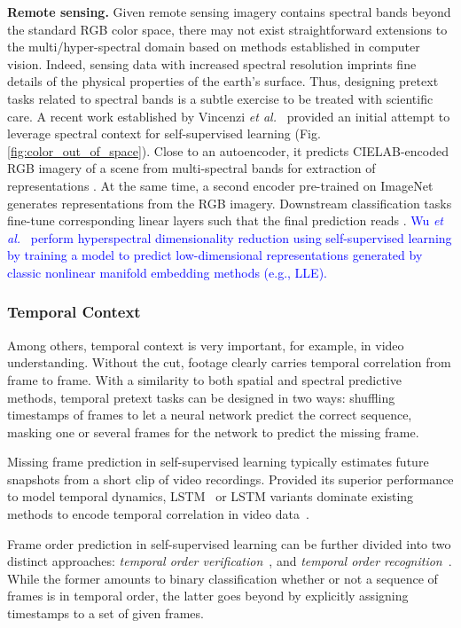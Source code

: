 \documentclass[lettersize,journal]{IEEEtran}
\newcommand{\etal}{\textit{et al.}}
\begin{document}
\textbf{Remote sensing.} Given remote sensing imagery contains spectral bands beyond the standard RGB color space, there may not exist straightforward extensions to the multi/hyper-spectral domain based on methods established in computer vision. Indeed, sensing data with increased spectral resolution imprints fine details of the physical properties of the earth's surface. Thus, designing pretext tasks related to spectral bands is a subtle exercise to be treated with scientific care. A recent work established by Vincenzi \etal~\cite{vincenzi2021color} provided an initial attempt to leverage spectral context for self-supervised learning (Fig. \ref{fig:color_out_of_space}). Close to an autoencoder, it predicts CIELAB-encoded RGB imagery of a scene from multi-spectral bands for extraction of representations . At the same time, a second encoder pre-trained on ImageNet generates representations  from the RGB imagery. Downstream classification tasks fine-tune corresponding linear layers  such that the final prediction reads . \textcolor{blue}{Wu \etal~\cite{wu2021hyper} perform hyperspectral dimensionality reduction using self-supervised learning by training a model to predict low-dimensional representations generated by classic nonlinear manifold embedding methods (e.g., LLE).}


\subsubsection{Temporal Context}

Among others, temporal context is very important, for example, in video understanding. Without the cut, footage clearly carries temporal correlation from frame to frame. With a similarity to both spatial and spectral predictive methods, temporal pretext tasks can be designed in two ways:  shuffling timestamps of frames to let a neural network predict the correct sequence,  masking one or several frames for the network to predict the missing frame.

Missing frame prediction in self-supervised learning typically estimates future snapshots from a short clip of video recordings. Provided its superior performance to model temporal dynamics, LSTM~\cite{6772729} or LSTM variants dominate existing methods to encode temporal correlation in video data~\cite{srivastava2015unsupervised,villegas2017decomposing,finn2016unsupervised}.

Frame order prediction in self-supervised learning can be further divided into two distinct approaches:  \textit{temporal order verification}~\cite{misra2016shuffle,wei2018learning,fernando2017self,misra2016unsupervised}, and  \textit{temporal order recognition}~\cite{lee2017unsupervised,xu2019self,kim2019self}. While the former amounts to binary classification whether or not a sequence of frames is in temporal order, the latter goes beyond by explicitly assigning timestamps to a set of given frames. 
\end{document}
